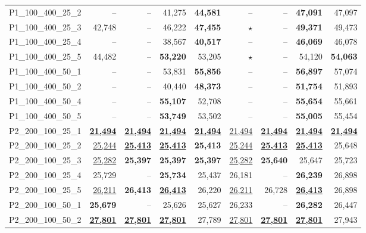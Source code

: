 \documentclass[smallextended]{svjour3}       %
\begin{document}
\begin{table}
\begin{tabular}{lrrrrrrrr}
P1\_100\_400\_25\_2 & -- & -- & 41,275 & \textbf{44,581} & -- & -- & \textbf{47,091} & 47,097 \\
P1\_100\_400\_25\_3 & 42,748 & -- & 46,222 & \textbf{47,455} & \(\star\) & -- & \textbf{49,371} & 49,473 \\
P1\_100\_400\_25\_4 & -- & -- & 38,567 & \textbf{40,517} & -- & -- & \textbf{46,069} & 46,078 \\
P1\_100\_400\_25\_5 & 44,482 & -- & \textbf{53,220} & 53,205 & \(\star\) & -- & 54,120 & \textbf{54,063} \\
P1\_100\_400\_50\_1 & -- & -- & 53,831 & \textbf{55,856} & -- & -- & \textbf{56,897} & 57,074 \\
P1\_100\_400\_50\_2 & -- & -- & 40,440 & \textbf{48,373} & -- & -- & \textbf{51,754} & 51,893 \\
P1\_100\_400\_50\_4 & -- & -- & \textbf{55,107} & 52,708 & -- & -- & \textbf{55,654} & 55,661 \\
P1\_100\_400\_50\_5 & -- & -- & \textbf{53,749} & 53,502 & -- & -- & \textbf{55,005} & 55,454 \\
P2\_200\_100\_25\_1 & \underline{\textbf{21,494}} & \underline{\textbf{21,494}} & \underline{\textbf{21,494}} & \underline{\textbf{21,494}} & \underline{21,494} & \underline{\textbf{21,494}} & \underline{\textbf{21,494}} & \underline{\textbf{21,494}} \\
P2\_200\_100\_25\_2 & \underline{25,244} & \underline{\textbf{25,413}} & \underline{\textbf{25,413}} & \textbf{25,413} & \underline{25,244} & \underline{\textbf{25,413}} & \underline{\textbf{25,413}} & 25,648 \\
P2\_200\_100\_25\_3 & \underline{25,282} & \textbf{25,397} & \textbf{25,397} & \textbf{25,397} & \underline{25,282} & \textbf{25,640} & 25,647 & 25,723 \\
P2\_200\_100\_25\_4 & 25,729 & -- & \textbf{25,734} & 25,437 & 26,181 & -- & \textbf{26,239} & 26,898 \\
P2\_200\_100\_25\_5 & \underline{26,211} & \textbf{26,413} & \underline{\textbf{26,413}} & 26,220 & \underline{26,211} & 26,728 & \underline{\textbf{26,413}} & 26,898 \\
P2\_200\_100\_50\_1 & \textbf{25,679} & -- & 25,626 & 25,627 & 26,233 & -- & \textbf{26,282} & 26,447 \\
P2\_200\_100\_50\_2 & \underline{\textbf{27,801}} & \underline{\textbf{27,801}} & \underline{\textbf{27,801}} & 27,789 & \underline{27,801} & \underline{\textbf{27,801}} & \underline{\textbf{27,801}} & 27,943 \\

\end{tabular}
\end{table}
\end{document}
